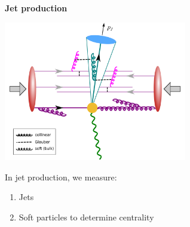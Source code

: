 \documentclass[9pt,a4paper,unknownkeysallowed,xcolor=dvipsnames,aspectratio=43]{beamer}
\begin{document}
%
%
\begin{frame}{\bf\huge Jet production}
\vspace{4mm}
\begin{center}
\includegraphics[width=0.6\textwidth]{fig/AA}\\
\end{center}
\vspace{2mm}
{\large In jet production, we measure:}
\begin{enumerate}
    \item{\large Jets}
    \item{\large Soft particles to determine centrality}
\end{enumerate}
\end{frame}
%
%
\end{document}
